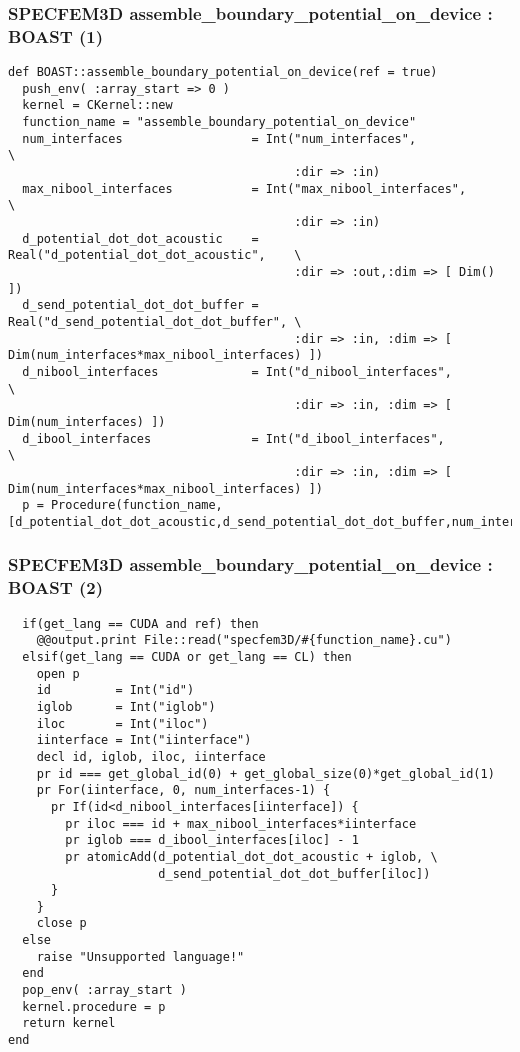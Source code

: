 \documentclass{beamer}
\begin{document}
\begin{frame}[fragile]
\frametitle{SPECFEM3D assemble\_boundary\_potential\_on\_device : BOAST (1)}
\lstset{style=BOAST}
\tiny
\begin{lstlisting}
def BOAST::assemble_boundary_potential_on_device(ref = true)
  push_env( :array_start => 0 )
  kernel = CKernel::new
  function_name = "assemble_boundary_potential_on_device"
  num_interfaces                  = Int("num_interfaces",                   \
                                        :dir => :in)
  max_nibool_interfaces           = Int("max_nibool_interfaces",            \
                                        :dir => :in)
  d_potential_dot_dot_acoustic    = Real("d_potential_dot_dot_acoustic",    \
                                        :dir => :out,:dim => [ Dim() ])
  d_send_potential_dot_dot_buffer = Real("d_send_potential_dot_dot_buffer", \
                                        :dir => :in, :dim => [ Dim(num_interfaces*max_nibool_interfaces) ])
  d_nibool_interfaces             = Int("d_nibool_interfaces",              \
                                        :dir => :in, :dim => [ Dim(num_interfaces) ])
  d_ibool_interfaces              = Int("d_ibool_interfaces",               \
                                        :dir => :in, :dim => [ Dim(num_interfaces*max_nibool_interfaces) ])
  p = Procedure(function_name, [d_potential_dot_dot_acoustic,d_send_potential_dot_dot_buffer,num_interfaces,max_nibool_interfaces,d_nibool_interfaces,d_ibool_interfaces])
\end{lstlisting}

\end{frame}

\begin{frame}[fragile]
\frametitle{SPECFEM3D assemble\_boundary\_potential\_on\_device : BOAST (2)}
\lstset{style=BOAST}
\tiny
\begin{lstlisting}
  if(get_lang == CUDA and ref) then
    @@output.print File::read("specfem3D/#{function_name}.cu")
  elsif(get_lang == CUDA or get_lang == CL) then
    open p
    id         = Int("id")
    iglob      = Int("iglob")
    iloc       = Int("iloc")
    iinterface = Int("iinterface")
    decl id, iglob, iloc, iinterface
    pr id === get_global_id(0) + get_global_size(0)*get_global_id(1)
    pr For(iinterface, 0, num_interfaces-1) {
      pr If(id<d_nibool_interfaces[iinterface]) {
        pr iloc === id + max_nibool_interfaces*iinterface
        pr iglob === d_ibool_interfaces[iloc] - 1
        pr atomicAdd(d_potential_dot_dot_acoustic + iglob, \
                     d_send_potential_dot_dot_buffer[iloc])
      }
    }
    close p
  else
    raise "Unsupported language!"
  end
  pop_env( :array_start )
  kernel.procedure = p
  return kernel
end
\end{lstlisting}

\end{frame}
\end{document}
